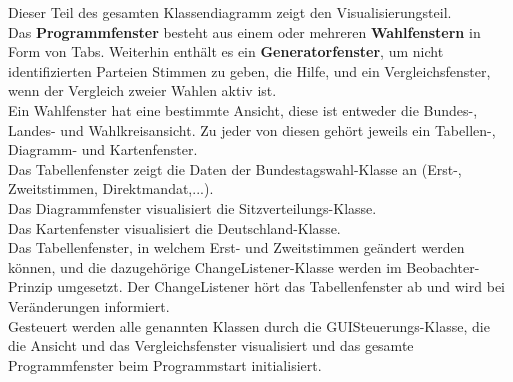 \documentclass[12pt,a4paper,titlepage]{article}
\newcommand{\myma}{\fontfamily{pcr}\selectfont \textbf}
\begin{document}
Dieser Teil des gesamten Klassendiagramm zeigt den Visualisierungsteil. \\
Das {\myma{Programmfenster}} besteht aus einem oder mehreren {\myma{Wahlfenstern}} in Form von Tabs. Weiterhin enthält es
ein {\myma{Generatorfenster}}, um nicht identifizierten Parteien Stimmen zu geben, die Hilfe, und
ein Vergleichsfenster, wenn der Vergleich zweier Wahlen aktiv ist. \\
Ein Wahlfenster hat eine bestimmte Ansicht, diese ist entweder die Bundes-, Landes- und
Wahlkreisansicht. Zu jeder von diesen gehört jeweils ein Tabellen-, Diagramm- und Kartenfenster. \\
Das Tabellenfenster zeigt die Daten der Bundestagswahl-Klasse an (Erst-, Zweitstimmen, Direktmandat,...).\\
Das Diagrammfenster visualisiert die Sitzverteilungs-Klasse. \\
Das Kartenfenster visualisiert die Deutschland-Klasse. \\
Das Tabellenfenster, in welchem Erst- und Zweitstimmen geändert werden können, und die
dazugehörige ChangeListener-Klasse werden im Beobachter-Prinzip umgesetzt. Der ChangeListener
hört das Tabellenfenster ab und wird bei Veränderungen informiert. \\
Gesteuert werden alle genannten Klassen durch die GUISteuerungs-Klasse, die die Ansicht und das
Vergleichsfenster visualisiert und das gesamte Programmfenster beim Programmstart initialisiert.
\end{document}
